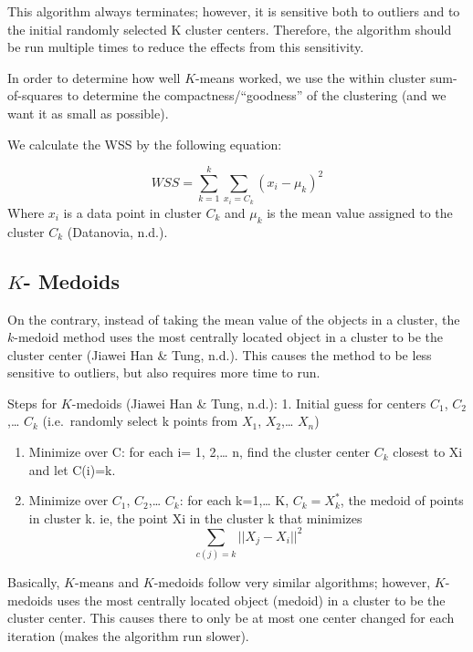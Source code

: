 \documentclass[12pt,twoside]{amherstthesis}
\begin{document}
  This algorithm always terminates; however, it is sensitive both to
  outliers and to the initial randomly selected K cluster centers.
  Therefore, the algorithm should be run multiple times to reduce the
  effects from this sensitivity.
  
  In order to determine how well \(K\)-means worked, we use the within
  cluster sum-of-squares to determine the compactness/``goodness'' of the
  clustering (and we want it as small as possible).
  
  We calculate the WSS by the following equation:
  
  \[WSS = \sum_{k=1}^k \sum_{x_i=C_k} ({{x_i- \mu_k}})^2\] Where \(x_i\)
  is a data point in cluster \(C_k\) and \(\mu_k\) is the mean value
  assigned to the cluster \(C_k\) (Datanovia, n.d.).
  
  \subsection{\texorpdfstring{\(K\)-
  Medoids}{K- Medoids}}\label{k--medoids}
  
  On the contrary, instead of taking the mean value of the objects in a
  cluster, the \(k\)-medoid method uses the most centrally located object
  in a cluster to be the cluster center (Jiawei Han \& Tung, n.d.). This
  causes the method to be less sensitive to outliers, but also requires
  more time to run.
  
  Steps for \(K\)-medoids (Jiawei Han \& Tung, n.d.): 1. Initial guess for
  centers \(C_1\), \(C_2\),\ldots{} \(C_k\) (i.e.~randomly select k points
  from \(X_1\), \(X_2\),\ldots{} \(X_n\))
  
  \begin{enumerate}
  \def\labelenumi{\arabic{enumi}.}
  \setcounter{enumi}{1}
  \item
    Minimize over C: for each i= 1, 2,\ldots{} n, find the cluster center
    \(C_k\) closest to Xi and let C(i)=k.
  \item
    Minimize over \(C_1\), \(C_2\),\ldots{} \(C_k\): for each k=1,\ldots{}
    K, \(C_k = X_k^*\), the medoid of points in cluster k. ie, the point
    Xi in the cluster k that minimizes
    \[\sum  _{c(j)=k} ||{{X_j- X_i}}||^2\]
  \end{enumerate}
  
  Basically, \(K\)-means and \(K\)-medoids follow very similar algorithms;
  however, \(K\)-medoids uses the most centrally located object (medoid)
  in a cluster to be the cluster center. This causes there to only be at
  most one center changed for each iteration (makes the algorithm run
  slower).
  
\end{document}
